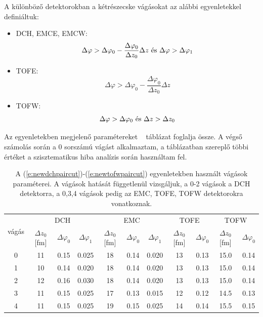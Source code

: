 \documentclass[11pt,a4paper]{article}
\numberwithin{equation}{subsection}
\numberwithin{figure}{section}
\begin{document}
\newpage
A különböző detektorokban a kétrészecske vágásokat az alábbi egyenletekkel definiáltuk:
\begin{itemize}
\item DCH, EMCE, EMCW:
\begin{equation}
\Delta\varphi > \Delta\varphi_0-\frac{\Delta\varphi_0}{\Delta z_0}\Delta z \textnormal{ és } \Delta\varphi > \Delta\varphi_1 \label{e:newdchpaircut}
\end{equation}
\item TOFE:
\begin{equation}
\Delta\varphi > \Delta\varphi_0-\frac{\Delta\varphi_0}{\Delta z_0}\Delta z \label{e:newtofepaircut}
\end{equation}
\item TOFW:
\begin{equation}
\Delta\varphi > \Delta\varphi_0 \textnormal{ és } \Delta z > \Delta z_0 \label{e:newtofwpaircut}
\end{equation}
\end{itemize}

Az egyenletekben megjelenő paramétereket ~ táblázat foglalja össze. A végső számolás során a $0$ sorszámú vágást alkalmaztam, a táblázatban szereplő többi értéket a szisztematikus hiba analízis során használtam fel.

\begin{table}[H]
\begin{center}
\begin{tabular}{|c||c|c|c||c|c|c||c|c||c|c|}\hline
\multirow{2}{*}{\small{vágás}} 
& \multicolumn{3}{c||}{DCH}
& \multicolumn{3}{c||}{EMC}
& \multicolumn{2}{c||}{TOFE}
& \multicolumn{2}{c|}{TOFW}\\
  & $\Delta z_0$ [fm] & $\Delta \varphi_0$ & $\Delta \varphi_1$ 
  & $\Delta z_0$ [fm] & $\Delta \varphi_0$ & $\Delta \varphi_1$
  & $\Delta z_0$ [fm] & $\Delta \varphi_0$
  & $\Delta z_0$ [fm] & $\Delta \varphi_0$\\\hline\hline
0 & 11 & 0.15 & 0.025 & 18 & 0.14 & 0.020 & 13 & 0.13 & 15.0 & 0.14\\\hline
1 & 10 & 0.14 & 0.020 & 18 & 0.14 & 0.020 & 13 & 0.13 & 15.0 & 0.14\\\hline
2 & 12 & 0.16 & 0.030 & 18 & 0.14 & 0.020 & 13 & 0.13 & 15.0 & 0.14\\\hline
3 & 11 & 0.15 & 0.025 & 17 & 0.13 & 0.015 & 12 & 0.12 & 14.5 & 0.13\\\hline
4 & 11 & 0.15 & 0.025 & 19 & 0.15 & 0.025 & 14 & 0.14 & 15.5 & 0.15\\\hline

\end{tabular}
\end{center}
\caption{A (\ref{e:newdchpaircut})-(\ref{e:newtofwpaircut}) egyenletekben használt vágások paraméterei. A vágások hatását függetlenül vizsgáljuk, a 0-2 vágások a DCH detektorra, a 0,3,4 vágások pedig az EMC, TOFE, TOFW detektorokra vonatkoznak.}
\label{tab:paircuts}
\end{table}
\end{document}
